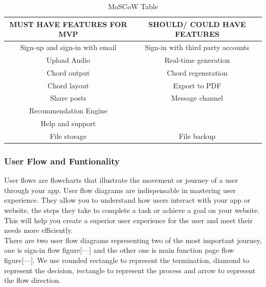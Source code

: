 \begin{table}[ht]
\centering
\begin{tabular}{ |c|c| } 
 \hline
\textbf{MUST HAVE FEATURES FOR MVP} & \textbf{SHOULD/ COULD HAVE FEATURES}\\ 
 \hline
 Sign-up and sign-in with email & Sign-in with third party accounts \\ 
 \hline
 Upload Audio & Real-time generation \\ 
 \hline
 Chord output & Chord regeneration \\ 
 \hline
 Chord layout &  Export to PDF \\ 
 \hline
 Share posts & Message channel \\ 
 \hline
 Recommendation Engine &  \\ 
 \hline
 Help and support &  \\ 
 \hline
 File storage& File backup \\ 
 \hline
 \end{tabular}
 \caption{MoSCoW Table}
 \centering
 \end{table}
 
 \subsubsection{User Flow and Funtionality}
User flows are flowcharts that illustrate the movement or journey of a user through your app. User flow diagrams are indispensable in mastering user experience. They allow you to understand how users interact with your app or website, the steps they take to complete a task or achieve a goal on your website. This will help you create a superior user experience for the user and meet their needs more efficiently.  
\\There are two user flow diagrams representing two of the most important journey, one is sign-in flow figure[---] and the other one is main function page flow figure[---]. We use rounded rectangle to represent the termination, diamond to represent the decision, rectangle to represent the process and arrow to represent the flow direction.

